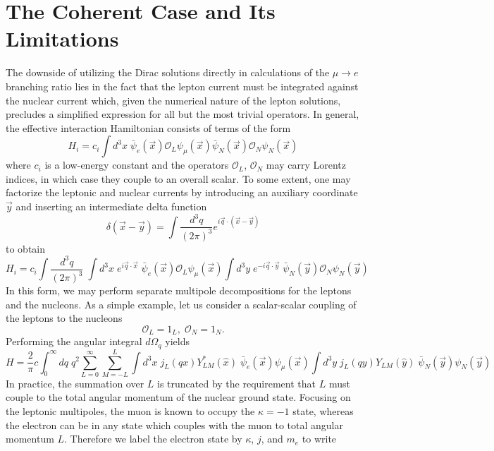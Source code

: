 \documentclass{book}[12pt]
\begin{document}
\section{The Coherent Case and Its Limitations}
The downside of utilizing the Dirac solutions directly in calculations of the $\mu\rightarrow e$ branching ratio lies in the fact that the lepton current must be integrated against the nuclear current which, given the numerical nature of the lepton solutions, precludes a simplified expression for all but the most trivial operators. In general, the effective interaction Hamiltonian consists of terms of the form
\begin{equation}
H_i= c_i \int d^3 x \;\bar{\psi}_e(\vec{x})\mathcal{O}_L\psi_{\mu}(\vec{x})\bar{\psi}_N(\vec{x})\mathcal{O}_N\psi_N(\vec{x})
\end{equation}
where $c_i$ is a low-energy constant and the operators $\mathcal{O}_L$, $\mathcal{O}_N$ may carry Lorentz indices, in which case they couple to an overall scalar. To some extent, one may factorize the leptonic and nuclear currents by introducing an auxiliary  coordinate $\vec{y}$ and inserting an intermediate delta function
\begin{equation}
\delta(\vec{x}-\vec{y})=\int \frac{d^3q}{(2\pi)^3}e^{i\vec{q}\cdot(\vec{x}-\vec{y})}
\end{equation}
to obtain
\begin{equation}
H_i=c_i\int \frac{d^3q}{(2\pi)^3}\;\int d^3x\;e^{i\vec{q}\cdot\vec{x}}\;\bar{\psi}_e(\vec{x})\mathcal{O}_L\psi_\mu(\vec{x})\int d^3y\;e^{-i\vec{q}\cdot\vec{y}}\;\bar{\psi}_N(\vec{y})\mathcal{O}_N\psi_N(\vec{y})
\end{equation}
In this form, we may perform separate multipole decompositions for the leptons and the nucleons. As a simple example, let us consider a scalar-scalar coupling of the leptons to the nucleons 
\begin{equation}
\mathcal{O}_L=1_L,\;\mathcal{O}_N=1_N.
\end{equation}
Performing the angular integral $d\Omega_q$ yields
\begin{equation}
H=\frac{2}{\pi}c\int_0^{\infty}dq\;q^2 \sum_{L=0}^{\infty}\sum_{M=-L}^L\int d^3x\;j_L(qx)Y^*_{LM}(\hat{x})\;\bar{\psi}_e(\vec{x})\psi_{\mu}(\vec{x})\int d^3y\;j_L(qy)Y_{LM}(\hat{y})\;\bar{\psi}_N(\vec{y})\psi_N(\vec{y})
\label{eq:H_full_multi}
\end{equation}
In practice, the summation over $L$ is truncated by the requirement that $L$ must couple to the total angular momentum of the nuclear ground state. Focusing on the leptonic multipoles, the muon is known to occupy the $\kappa=-1$ state, whereas the electron can be in any state which couples with the muon to total angular momentum $L$. Therefore we label the electron state by $\kappa$, $j$, and $m_e$ to write
\end{document}
